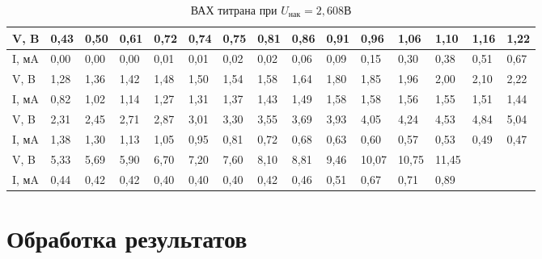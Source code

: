 \documentclass[a4paper]{article}
\begin{document}
\begin{enumerate}
\begin{table}[H]
  \begin{tabular}{|l|l|l|l|l|l|l|l|l|l|l|l|l|l|l|}
    \hline
  V, B  & 0,43 & 0,50 & 0,61 & 0,72 & 0,74 & 0,75 & 0,81 & 0,86 & 0,91 & 0,96  & 1,06  & 1,10  & 1,16 & 1,22 \\ \hline
  I, мA & 0,00                         & 0,00                         & 0,00 & 0,01 & 0,01 & 0,02 & 0,02 & 0,06 & 0,09 & 0,15  & 0,30  & 0,38  & 0,51 & 0,67 \\ \hline
  V, B  & 1,28                         & 1,36                         & 1,42 & 1,48 & 1,50 & 1,54 & 1,58 & 1,64 & 1,80 & 1,85  & 1,96  & 2,00  & 2,10 & 2,22 \\ \hline
  I, мA & 0,82                         & 1,02                         & 1,14 & 1,27 & 1,31 & 1,37 & 1,43 & 1,49 & 1,58 & 1,58  & 1,56  & 1,55  & 1,51 & 1,44 \\ \hline
  V, B  & 2,31                         & 2,45                         & 2,71 & 2,87 & 3,01 & 3,30 & 3,55 & 3,69 & 3,93 & 4,05  & 4,24  & 4,53  & 4,84 & 5,04 \\ \hline
  I, мA & 1,38                         & 1,30                         & 1,13 & 1,05 & 0,95 & 0,81 & 0,72 & 0,68 & 0,63 & 0,60  & 0,57  & 0,53  & 0,49 & 0,47 \\ \hline
  V, B  & 5,33                         & 5,69                         & 5,90 & 6,70 & 7,20 & 7,60 & 8,10 & 8,81 & 9,46 & 10,07 & 10,75 & 11,45 &      &      \\ \hline
  I, мA & 0,44                         & 0,42                         & 0,42 & 0,40 & 0,40 & 0,40 & 0,42 & 0,46 & 0,51 & 0,67  & 0,71  & 0,89  &      &     \\ \hline
  \end{tabular}
  \caption{ВАХ титрана при $U_{нак} = 2,608 В$}
  \end{table}
\end{enumerate}



\section{Обработка результатов}
\end{document}
